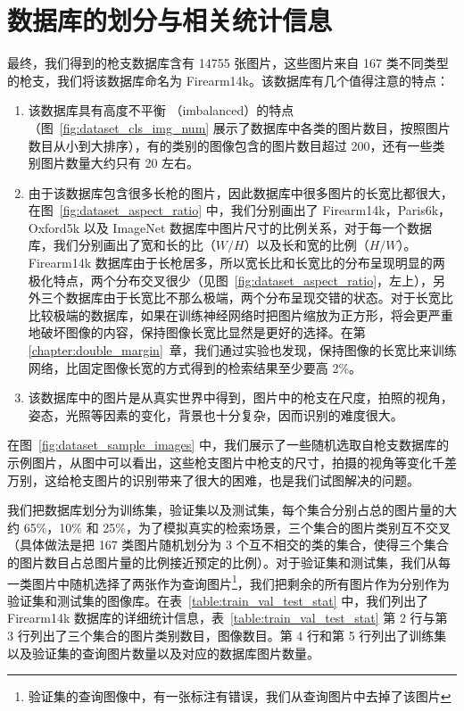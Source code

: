 \section{数据库的划分与相关统计信息}\label{sec:dataset_stats}
最终，我们得到的枪支数据库含有 14755 张图片，这些图片来自 167 类不同类型的枪支，我们将该数据库命名为 Firearm14k。该数据库有几个值得注意的特点：

\begin{enumerate}
\item  该数据库具有高度不平衡 （imbalanced）的特点（图~\ref{fig:dataset_cls_img_num} 展示了数据库中各类的图片数目，按照图片数目从小到大排序），有的类别的图像包含的图片数目超过 200，还有一些类别图片数量大约只有 20 左右。

\item  由于该数据库包含很多长枪的图片，因此数据库中很多图片的长宽比都很大，在图~\ref{fig:dataset_aspect_ratio} 中，我们分别画出了 Firearm14k，Paris6k，Oxford5k 以及 ImageNet 数据库中图片尺寸的比例关系，对于每一个数据库，我们分别画出了宽和长的比（$W/H$）以及长和宽的比例（$H/W$）。Firearm14k 数据库由于长枪居多，所以宽长比和长宽比的分布呈现明显的两极化特点，两个分布交叉很少（见图~\ref{fig:dataset_aspect_ratio}，左上），另外三个数据库由于长宽比不那么极端，两个分布呈现交错的状态。对于长宽比比较极端的数据库，如果在训练神经网络时把图片缩放为正方形，将会更严重地破坏图像的内容，保持图像长宽比显然是更好的选择。在第 \ref{chapter:double_margin}~章，我们通过实验也发现，保持图像的长宽比来训练网络，比固定图像长宽的方式得到的检索结果至少要高 2\%。

\item 该数据库中的图片是从真实世界中得到，图片中的枪支在尺度，拍照的视角，姿态，光照等因素的变化，背景也十分复杂，因而识别的难度很大。
\end{enumerate}

在图~\ref{fig:dataset_sample_images} 中，我们展示了一些随机选取自枪支数据库的示例图片，从图中可以看出，这些枪支图片中枪支的尺寸，拍摄的视角等变化千差万别，这给枪支图片的识别带来了很大的困难，也是我们试图解决的问题。

我们把数据库划分为训练集，验证集以及测试集，每个集合分别占总的图片量的大约 65\%，10\% 和 25\%，为了模拟真实的检索场景，三个集合的图片类别互不交叉 （具体做法是把 167 类图片随机划分为 3 个互不相交的类的集合，使得三个集合的图片数目占总图片量的比例接近预定的比例）。对于验证集和测试集，我们从每一类图片中随机选择了两张作为查询图片\footnote{验证集的查询图像中，有一张标注有错误，我们从查询图片中去掉了该图片}，我们把剩余的所有图片作为分别作为验证集和测试集的图像库。在表~\ref{table:train_val_test_stat} 中，我们列出了 Firearm14k 数据库的详细统计信息，表~\ref{table:train_val_test_stat} 第 2 行与第 3 行列出了三个集合的图片类别数目，图像数目。第 4 行和第 5 行列出了训练集以及验证集的查询图片数量以及对应的数据库图片数量。

